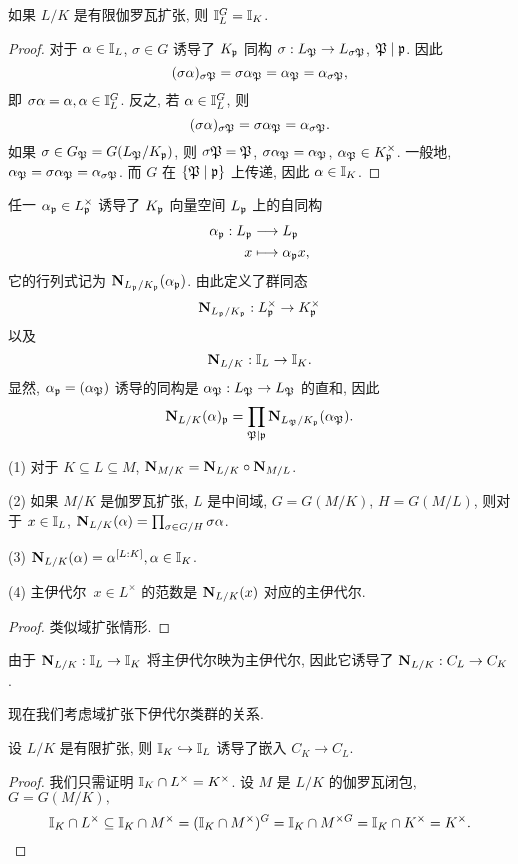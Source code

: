 \begin{proposition}{}{}
如果 $L/K$ 是有限伽罗瓦扩张, 则 ${\mathbb{I}}_L^G={\mathbb{I}}_K$.
\end{proposition}
\begin{proof}
对于 $\alpha\in {\mathbb{I}}_L$, $\sigma\in G$ 诱导了 $K_{\mathfrak{p}}$ 同构 $\sigma:L_{\mathfrak{P}}\to L_{\sigma{\mathfrak{P}}}$, ${\mathfrak{P}}\mid{\mathfrak{p}}$. 因此
  \[(\sigma\alpha)_{\sigma{\mathfrak{P}}}=\sigma\alpha_{\mathfrak{P}}=\alpha_{\mathfrak{P}}=\alpha_{\sigma{\mathfrak{P}}},\]
即 $\sigma\alpha=\alpha,\alpha\in {\mathbb{I}}_L^G$. 反之, 若 $\alpha\in{\mathbb{I}}_L^G$, 则
  \[(\sigma\alpha)_{\sigma{\mathfrak{P}}}=\sigma\alpha_{\mathfrak{P}}=\alpha_{\sigma{\mathfrak{P}}}.\]
如果 $\sigma\in G_{\mathfrak{P}}=G(L_{\mathfrak{P}}/K_{\mathfrak{p}})$, 则 $\sigma{\mathfrak{P}}={\mathfrak{P}}$, $\sigma\alpha_{\mathfrak{P}}=\alpha_{\mathfrak{P}}$, $\alpha_{\mathfrak{P}}\in K_{\mathfrak{p}}^\times$. 一般地, $\alpha_{\mathfrak{P}}=\sigma\alpha_{\mathfrak{P}}=\alpha_{\sigma{\mathfrak{P}}}$. 而 $G$ 在 $\left\{{\mathfrak{P}}\mid {\mathfrak{p}}\right\}$ 上传递, 因此 $\alpha\in{\mathbb{I}}_K$.
\end{proof}

任一 $\alpha_{\mathfrak{p}} \in L_{\mathfrak{p}}^\times$ 诱导了 $K_{\mathfrak{p}}$ 向量空间 $L_{\mathfrak{p}}$ 上的自同构 
  \[\begin{split}\alpha_{\mathfrak{p}}:L_{\mathfrak{p}} &\longrightarrow L_{\mathfrak{p}} \\ x &\longmapsto \alpha_{\mathfrak{p}} x,\end{split}\]
它的行列式记为 ${\mathbf{N}}_{L_{\mathfrak{p}}/K_{\mathfrak{p}}}(\alpha_{\mathfrak{p}})$. 由此定义了群同态
  \[{\mathbf{N}}_{L_{\mathfrak{p}}/K_{\mathfrak{p}}}:L_{\mathfrak{p}}^\times\to K_{\mathfrak{p}}^\times\]
以及
  \[{\mathbf{N}}_{L/K}:{\mathbb{I}}_L\to {\mathbb{I}}_K.\]
显然, $\alpha_{\mathfrak{p}}=(\alpha_{\mathfrak{P}})$ 诱导的同构是 $\alpha_{\mathfrak{P}}:L_{\mathfrak{P}}\to L_{\mathfrak{P}}$ 的直和, 因此
  \[{\mathbf{N}}_{L/K}(\alpha)_{\mathfrak{p}}=\prod_{{\mathfrak{P}}\mid {\mathfrak{p}}}{\mathbf{N}}_{L_{\mathfrak{P}}/K_{\mathfrak{p}}}(\alpha_{\mathfrak{P}}).\]

\begin{proposition}{}{}
(1) 对于 $K\subseteq L\subseteq M$, ${\mathbf{N}}_{M/K}={\mathbf{N}}_{L/K}\circ {\mathbf{N}}_{M/L}$.

(2) 如果 $M/K$ 是伽罗瓦扩张, $L$ 是中间域, $G=G(M/K)$, $H=G(M/L)$, 则对于 $x\in{\mathbb{I}}_L$, ${\mathbf{N}}_{L/K}(\alpha)=\prod_{\sigma\in G/H}\sigma\alpha$.

(3) ${\mathbf{N}}_{L/K}(\alpha)=\alpha^{[L:K]},\alpha\in {\mathbb{I}}_K$.

(4) 主伊代尔\ $x\in L^\times$ 的范数是 ${\mathbf{N}}_{L/K}(x)$ 对应的主伊代尔.
\end{proposition}
\begin{proof}
类似域扩张情形.
\end{proof}

由于 ${\mathbf{N}}_{L/K}:{\mathbb{I}}_L\to{\mathbb{I}}_K$ 将主伊代尔映为主伊代尔, 因此它诱导了 ${\mathbf{N}}_{L/K}:C_L\to C_K$.

现在我们考虑域扩张下伊代尔类群的关系.
\begin{proposition}{}{}
设 $L/K$ 是有限扩张, 则 ${\mathbb{I}}_K\hookrightarrow {\mathbb{I}}_L$ 诱导了嵌入 $C_K\to C_L.$
\end{proposition}
\begin{proof}
我们只需证明 ${\mathbb{I}}_K\cap L^\times=K^\times$. 设 $M$ 是 $L/K$ 的伽罗瓦闭包, $G=G(M/K),$
  \[{\mathbb{I}}_K\cap L^\times\subseteq {\mathbb{I}}_K\cap M^\times= ({\mathbb{I}}_K\cap M^\times)^G={\mathbb{I}}_K\cap M^{\times G}={\mathbb{I}}_K\cap K^\times=K^\times.\]
\end{proof}

